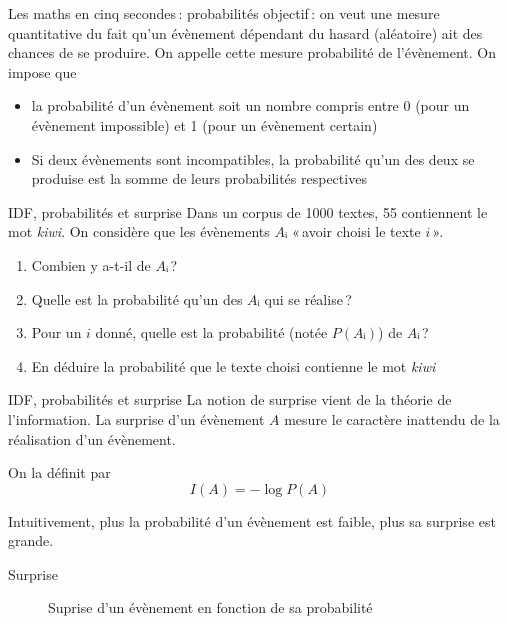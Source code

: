 \documentclass[hyperref={unicode}, xcolor={svgnames}, french]{beamer}
\begin{document}
\begin{frame}{Les maths en cinq secondes : probabilités}
	objectif : on veut une mesure \alert{quantitative} du fait qu'un évènement dépendant du hasard (aléatoire) ait des chances de se produire. On appelle cette mesure \alert{probabilité} de l'évènement.
	\pause
	On impose que
	\begin{itemize}
		\item la probabilité d'un évènement soit un nombre compris entre \num{0} (pour un évènement impossible) et \num{1} (pour un évènement certain)
		\item Si deux évènements sont \alert{incompatibles}, la probabilité qu'un des deux se produise est la somme de leurs probabilités respectives
	\end{itemize}
\end{frame}

\begin{frame}{IDF, probabilités et surprise}
	Dans un corpus de \num{1000} textes, \num{55} contiennent le mot \emph{kiwi}.
	\pause
	On considère que les évènements $Aᵢ$ « avoir choisi le texte $i$ ».
	\begin{enumerate}
		\item Combien y a-t-il de $Aᵢ$ ?
		\item Quelle est la probabilité qu'un des $Aᵢ$ qui se réalise ?
		\item Pour un $i$ donné, quelle est la probabilité (notée $P(Aᵢ)$) de $Aᵢ$ ?
		\item En déduire la probabilité que le texte choisi contienne le mot \emph{kiwi}
	\end{enumerate}
\end{frame}

\begin{frame}{IDF, probabilités et surprise}
	La notion de \alert{surprise} vient de la théorie de l'information. La surprise d'un évènement $A$ mesure le caractère inattendu de la réalisation d'un évènement.

	On la définit par
	\begin{equation}
		I(A) = -\log P(A)
	\end{equation}

	Intuitivement, plus la probabilité d'un évènement est faible, plus sa surprise est grande.
\end{frame}

\begin{frame}{Surprise}
    \begin{figure}
        \tikzset{external/export=true}
        \caption{Suprise d'un évènement en fonction de sa probabilité}
    \end{figure}
\end{frame}
\end{document}
